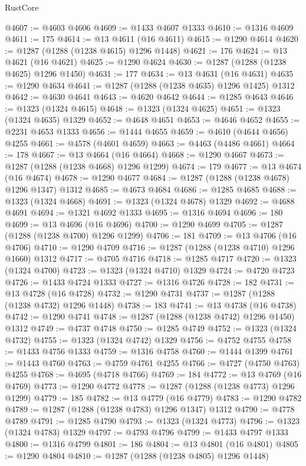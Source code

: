 \begin{lexlean}{RustCore}
\begin{coremodule}
@4607 := @4603 @4606
@4609 := @1433 @4607 @1333
@4610 := @1316 @4609
@4611 := 175
@4614 := @13 @4611 (@16 @4611)
@4615 := @1290 @4614
@4620 := @1287 (@1288 (@1238 @4615) @1296 @1448)
@4621 := 176
@4624 := @13 @4621 (@16 @4621)
@4625 := @1290 @4624
@4630 := @1287 (@1288 (@1238 @4625) @1296 @1450)
@4631 := 177
@4634 := @13 @4631 (@16 @4631)
@4635 := @1290 @4634
@4641 := @1287 (@1288 (@1238 @4635) @1296 @1425) @1312
@4642 := @4630 @4641
@4643 := @4620 @4642
@4644 := @1285 @4643
@4646 := @1323 (@1324 @4615)
@4648 := @1323 (@1324 @4625)
@4651 := @1323 (@1324 @4635) @1329
@4652 := @4648 @4651
@4653 := @4646 @4652
@4655 := @2231 @4653 @1333
@4656 := @1444 @4655
@4659 := @4610 (@4644 @4656) @4255
@4661 := @4578 (@4601 @4659)
@4663 := @4463 (@4486 @4661)
@4664 := 178
@4667 := @13 @4664 (@16 @4664)
@4668 := @1290 @4667
@4673 := @1287 (@1288 (@1238 @4668) @1296 @1299)
@4674 := 179
@4677 := @13 @4674 (@16 @4674)
@4678 := @1290 @4677
@4684 := @1287 (@1288 (@1238 @4678) @1296 @1347) @1312
@4685 := @4673 @4684
@4686 := @1285 @4685
@4688 := @1323 (@1324 @4668)
@4691 := @1323 (@1324 @4678) @1329
@4692 := @4688 @4691
@4694 := @1321 @4692 @1333
@4695 := @1316 @4694
@4696 := 180
@4699 := @13 @4696 (@16 @4696)
@4700 := @1290 @4699
@4705 := @1287 (@1288 (@1238 @4700) @1296 @1299)
@4706 := 181
@4709 := @13 @4706 (@16 @4706)
@4710 := @1290 @4709
@4716 := @1287 (@1288 (@1238 @4710) @1296 @1660) @1312
@4717 := @4705 @4716
@4718 := @1285 @4717
@4720 := @1323 (@1324 @4700)
@4723 := @1323 (@1324 @4710) @1329
@4724 := @4720 @4723
@4726 := @1433 @4724 @1333
@4727 := @1316 @4726
@4728 := 182
@4731 := @13 @4728 (@16 @4728)
@4732 := @1290 @4731
@4737 := @1287 (@1288 (@1238 @4732) @1296 @1448)
@4738 := 183
@4741 := @13 @4738 (@16 @4738)
@4742 := @1290 @4741
@4748 := @1287 (@1288 (@1238 @4742) @1296 @1450) @1312
@4749 := @4737 @4748
@4750 := @1285 @4749
@4752 := @1323 (@1324 @4732)
@4755 := @1323 (@1324 @4742) @1329
@4756 := @4752 @4755
@4758 := @1433 @4756 @1333
@4759 := @1316 @4758
@4760 := @1444 @1399
@4761 := @1443 @4760
@4763 := @4759 @4761 @4255
@4766 := @4727 (@4750 @4763) @4255
@4768 := @4695 (@4718 @4766)
@4769 := 184
@4772 := @13 @4769 (@16 @4769)
@4773 := @1290 @4772
@4778 := @1287 (@1288 (@1238 @4773) @1296 @1299)
@4779 := 185
@4782 := @13 @4779 (@16 @4779)
@4783 := @1290 @4782
@4789 := @1287 (@1288 (@1238 @4783) @1296 @1347) @1312
@4790 := @4778 @4789
@4791 := @1285 @4790
@4793 := @1323 (@1324 @4773)
@4796 := @1323 (@1324 @4783) @1329
@4797 := @4793 @4796
@4799 := @1433 @4797 @1333
@4800 := @1316 @4799
@4801 := 186
@4804 := @13 @4801 (@16 @4801)
@4805 := @1290 @4804
@4810 := @1287 (@1288 (@1238 @4805) @1296 @1448)

\end{coremodule}
\end{lexlean}
